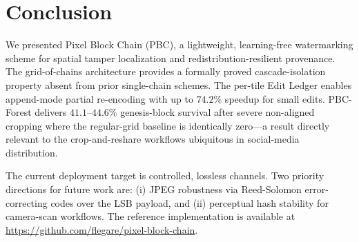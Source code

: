 \documentclass[conference]{IEEEtran}
\begin{document}
\section{Conclusion}
\label{sec:conclusion}

We presented Pixel Block Chain (PBC), a lightweight, learning-free
watermarking scheme for spatial tamper localization and
redistribution-resilient provenance. The grid-of-chains architecture
provides a formally proved cascade-isolation property absent from prior
single-chain schemes. The per-tile Edit Ledger enables append-mode
partial re-encoding with up to $74.2\%$ speedup for small edits.
PBC-Forest delivers $41.1$--$44.6\%$ genesis-block survival after
severe non-aligned cropping where the regular-grid baseline is
identically zero---a result directly relevant to the crop-and-reshare
workflows ubiquitous in social-media distribution.

The current deployment target is controlled, lossless channels. Two
priority directions for future work are: (i) JPEG robustness via
Reed-Solomon error-correcting codes over the LSB payload, and (ii)
perceptual hash stability for camera-scan workflows. The reference
implementation is available at
\url{https://github.com/flegare/pixel-block-chain}.

\balance

\end{document}
